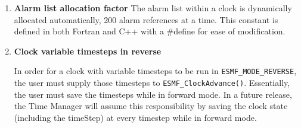
\begin{enumerate}

\item {\bf Alarm list allocation factor}  The alarm list within a clock is
dynamically allocated automatically, 200 alarm references at a time.
This constant is defined in both Fortran and C++ with a \#define for ease
of modification.

\item {\bf Clock variable timesteps in reverse} 
\begin{sloppypar}
In order for a clock with
variable timesteps to be run in {\tt ESMF\_MODE\_REVERSE}, the user must
supply those timesteps to {\tt ESMF\_ClockAdvance()}.  Essentially, the user
must save the timesteps while in forward mode.  In a future release, the
Time Manager will assume this responsibility by saving the clock state
(including the timeStep) at every timestep while in forward mode.
\end{sloppypar}

\end{enumerate}
